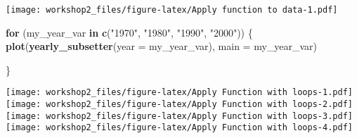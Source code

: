 \documentclass[
]{article}
\newenvironment{Shaded}{\begin{snugshade}}{\end{snugshade}}
\newcommand{\AttributeTok}[1]{\textcolor[rgb]{0.13,0.29,0.53}{#1}}
\newcommand{\ControlFlowTok}[1]{\textcolor[rgb]{0.13,0.29,0.53}{\textbf{#1}}}
\newcommand{\FunctionTok}[1]{\textcolor[rgb]{0.13,0.29,0.53}{\textbf{#1}}}
\newcommand{\NormalTok}[1]{#1}
\newcommand{\StringTok}[1]{\textcolor[rgb]{0.31,0.60,0.02}{#1}}
\begin{document}
\texttt{[image: workshop2\_files/figure-latex/Apply function to data-1.pdf]}

\begin{Shaded}
\begin{Highlighting}[]
\ControlFlowTok{for}\NormalTok{ (my\_year\_var }\ControlFlowTok{in} \FunctionTok{c}\NormalTok{(}\StringTok{"1970"}\NormalTok{, }\StringTok{"1980"}\NormalTok{, }\StringTok{"1990"}\NormalTok{, }\StringTok{"2000"}\NormalTok{)) \{}
  \FunctionTok{plot}\NormalTok{(}\FunctionTok{yearly\_subsetter}\NormalTok{(}\AttributeTok{year =}\NormalTok{ my\_year\_var), }\AttributeTok{main =}\NormalTok{ my\_year\_var)}
  
\NormalTok{\}}
\end{Highlighting}
\end{Shaded}

\texttt{[image: workshop2\_files/figure-latex/Apply Function with loops-1.pdf]}
\texttt{[image: workshop2\_files/figure-latex/Apply Function with loops-2.pdf]}
\texttt{[image: workshop2\_files/figure-latex/Apply Function with loops-3.pdf]}
\texttt{[image: workshop2\_files/figure-latex/Apply Function with loops-4.pdf]}
\end{document}
